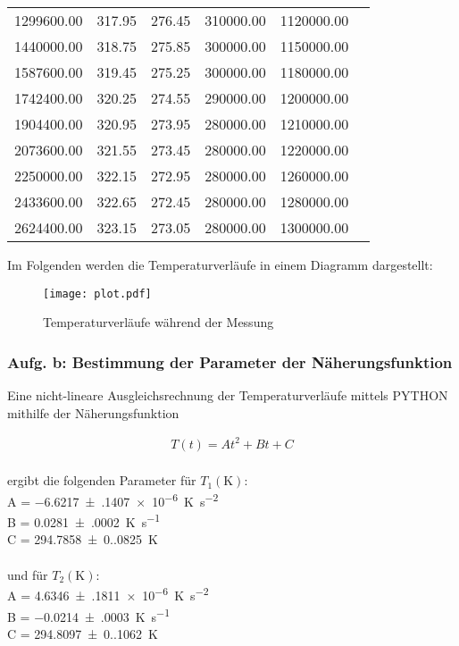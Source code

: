 \begin{table}
\begin{tabular}{c c c c c c}
    1299600.00 &  317.95 &  276.45 & 310000.00 & 1120000.00 \\
    1440000.00 &  318.75 &  275.85 & 300000.00 & 1150000.00 \\
    1587600.00 &  319.45 &  275.25 & 300000.00 & 1180000.00 \\
    1742400.00 &  320.25 &  274.55 & 290000.00 & 1200000.00 \\
    1904400.00 &  320.95 &  273.95 & 280000.00 & 1210000.00 \\
    2073600.00 &  321.55 &  273.45 & 280000.00 & 1220000.00 \\
    2250000.00 &  322.15 &  272.95 & 280000.00 & 1260000.00 \\
    2433600.00 &  322.65 &  272.45 & 280000.00 & 1280000.00 \\
    2624400.00 &  323.15 &  273.05 & 280000.00 & 1300000.00 \\
    \bottomrule
  \end{tabular}
\end{table}

\newpage


Im Folgenden werden die Temperaturverläufe in einem Diagramm dargestellt:

\begin{figure}
  \centering
  \texttt{[image: plot.pdf]}
  \caption{Temperaturverläufe während der Messung}
  \label{fig:plot}
\end{figure}

\subsubsection{Aufg. b: Bestimmung der Parameter der Näherungsfunktion}

Eine nicht-lineare Ausgleichsrechnung der Temperaturverläufe mittels PYTHON mithilfe der Näherungsfunktion

\begin{align*} 
  T(t) = At^2 + Bt + C 
\end{align*}
\\
ergibt die folgenden Parameter für $T_{1} (\unit{\kelvin})$: \\
A = \qty{-6.6217(1407)e-6}{\unit[per-mode=reciprocal]{\kelvin\per\second\squared}} \\
B = \qty{0.0281(0002)}{\unit[per-mode=reciprocal]{\kelvin\per\second}} \\
C = \qty{294.7858(0.0825)}{\unit\kelvin} \\
\\
und für $T_{2} (\unit{\kelvin})$: \\
A = \qty{4.6346(1811)e-6}{\unit[per-mode=reciprocal]{\kelvin\per\second\squared}} \\
B = \qty{-0.0214(0003)}{\unit[per-mode=reciprocal]{\kelvin\per\second}} \\
C = \qty{294.8097(0.1062)}{\unit\kelvin} \\

